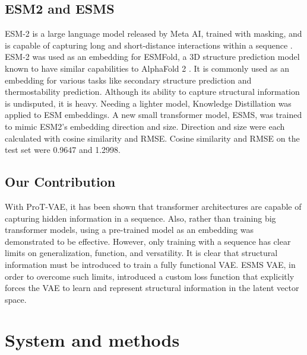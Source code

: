 \documentclass[unnumsec,webpdf,contemporary,medium]{oup-authoring-template}
\begin{document}
\subsection{ESM2 and ESMS}\label{subsec:esm}
ESM-2 is a large language model released by Meta AI, trained with masking, and is capable of capturing long and short-distance interactions within a sequence \cite{rives2021biological}. ESM-2 was used as an embedding for ESMFold, a 3D structure prediction model known to have similar capabilities to AlphaFold 2 \cite{lin2022esmfold, jumper2021highly}. It is commonly used as an embedding for various tasks like secondary structure prediction and thermostability prediction. Although its ability to capture structural information is undisputed, it is heavy. Needing a lighter model, Knowledge Distillation \cite{hinton2015distillingknowledgeneuralnetwork} was applied to ESM embeddings. A new small transformer model, ESMS, was trained to mimic ESM2's embedding direction and size. Direction and size were each calculated with cosine similarity and RMSE. Cosine similarity and RMSE on the test set were 0.9647 and 1.2998.

\subsection{Our Contribution}
With ProT-VAE, it has been shown that transformer architectures are capable of capturing hidden information in a sequence. Also, rather than training big transformer models, using a pre-trained model as an embedding was demonstrated to be effective. However, only training with a sequence has clear limits on generalization, function, and versatility. It is clear that structural information must be introduced to train a fully functional VAE. ESMS VAE, in order to overcome such limits, introduced a custom loss function that explicitly forces the VAE to learn and represent structural information in the latent vector space.

\section{System and methods}\label{sec:methods}
\end{document}
